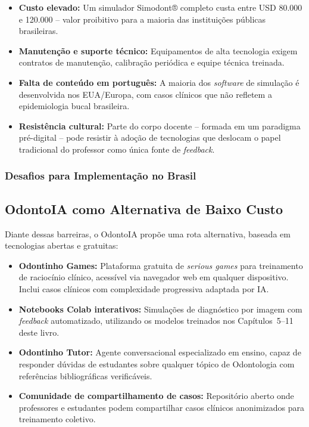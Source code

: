 \begin{itemize}
  \item \textbf{Custo elevado:} Um simulador Simodont® completo custa entre
    USD 80.000 e 120.000 -- valor proibitivo para a maioria das instituições
    públicas brasileiras.

  \item \textbf{Manutenção e suporte técnico:} Equipamentos de alta tecnologia
    exigem contratos de manutenção, calibração periódica e equipe técnica
    treinada.

  \item \textbf{Falta de conteúdo em português:} A maioria dos \textit{software}
    de simulação é desenvolvida nos EUA/Europa, com casos clínicos que não
    refletem a epidemiologia bucal brasileira.

  \item \textbf{Resistência cultural:} Parte do corpo docente -- formada em um
    paradigma pré-digital -- pode resistir à adoção de tecnologias que
    deslocam o papel tradicional do professor como única fonte de
    \textit{feedback}.
\end{itemize}

\subsubsection{Desafios para Implementação no Brasil}

\subsection{OdontoIA como Alternativa de Baixo Custo}

Diante dessas barreiras, o OdontoIA propõe uma rota alternativa, baseada em
tecnologias abertas e gratuitas:

\begin{itemize}
  \item \textbf{Odontinho Games:} Plataforma gratuita de \textit{serious games}
    para treinamento de raciocínio clínico, acessível via navegador web em
    qualquer dispositivo. Inclui casos clínicos com complexidade progressiva
    adaptada por IA.

  \item \textbf{Notebooks Colab interativos:} Simulações de diagnóstico por
    imagem com \textit{feedback} automatizado, utilizando os modelos treinados
    nos Capítulos~5--11 deste livro.

  \item \textbf{Odontinho Tutor:} Agente conversacional especializado em ensino,
    capaz de responder dúvidas de estudantes sobre qualquer tópico de
    Odontologia com referências bibliográficas verificáveis.

  \item \textbf{Comunidade de compartilhamento de casos:} Repositório aberto
    onde professores e estudantes podem compartilhar casos clínicos anonimizados
    para treinamento coletivo.
\end{itemize}


